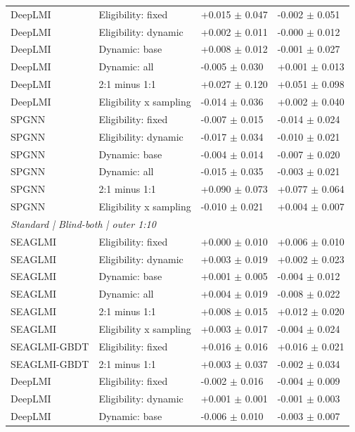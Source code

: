 {\begin{longtable}{llll}
DeepLMI & Eligibility: fixed & +0.015 $\pm$ 0.047 & -0.002 $\pm$ 0.051 \\
DeepLMI & Eligibility: dynamic & +0.002 $\pm$ 0.011 & -0.000 $\pm$ 0.012 \\
DeepLMI & Dynamic: base & +0.008 $\pm$ 0.012 & -0.001 $\pm$ 0.027 \\
DeepLMI & Dynamic: all & -0.005 $\pm$ 0.030 & +0.001 $\pm$ 0.013 \\
DeepLMI & 2:1 minus 1:1 & +0.027 $\pm$ 0.120 & +0.051 $\pm$ 0.098 \\
DeepLMI & Eligibility x sampling & -0.014 $\pm$ 0.036 & +0.002 $\pm$ 0.040 \\
SPGNN & Eligibility: fixed & -0.007 $\pm$ 0.015 & -0.014 $\pm$ 0.024 \\
SPGNN & Eligibility: dynamic & -0.017 $\pm$ 0.034 & -0.010 $\pm$ 0.021 \\
SPGNN & Dynamic: base & -0.004 $\pm$ 0.014 & -0.007 $\pm$ 0.020 \\
SPGNN & Dynamic: all & -0.015 $\pm$ 0.035 & -0.003 $\pm$ 0.021 \\
SPGNN & 2:1 minus 1:1 & +0.090 $\pm$ 0.073 & +0.077 $\pm$ 0.064 \\
SPGNN & Eligibility x sampling & -0.010 $\pm$ 0.021 & +0.004 $\pm$ 0.007 \\
\multicolumn{4}{l}{\textit{Standard | Blind-both | outer 1:10}}\\
SEAGLMI & Eligibility: fixed & +0.000 $\pm$ 0.010 & +0.006 $\pm$ 0.010 \\
SEAGLMI & Eligibility: dynamic & +0.003 $\pm$ 0.019 & +0.002 $\pm$ 0.023 \\
SEAGLMI & Dynamic: base & +0.001 $\pm$ 0.005 & -0.004 $\pm$ 0.012 \\
SEAGLMI & Dynamic: all & +0.004 $\pm$ 0.019 & -0.008 $\pm$ 0.022 \\
SEAGLMI & 2:1 minus 1:1 & +0.008 $\pm$ 0.015 & +0.012 $\pm$ 0.020 \\
SEAGLMI & Eligibility x sampling & +0.003 $\pm$ 0.017 & -0.004 $\pm$ 0.024 \\
SEAGLMI-GBDT & Eligibility: fixed & +0.016 $\pm$ 0.016 & +0.016 $\pm$ 0.021 \\
SEAGLMI-GBDT & 2:1 minus 1:1 & +0.003 $\pm$ 0.037 & -0.002 $\pm$ 0.034 \\
DeepLMI & Eligibility: fixed & -0.002 $\pm$ 0.016 & -0.004 $\pm$ 0.009 \\
DeepLMI & Eligibility: dynamic & +0.001 $\pm$ 0.001 & -0.001 $\pm$ 0.003 \\
DeepLMI & Dynamic: base & -0.006 $\pm$ 0.010 & -0.003 $\pm$ 0.007 \\

\end{longtable}}
